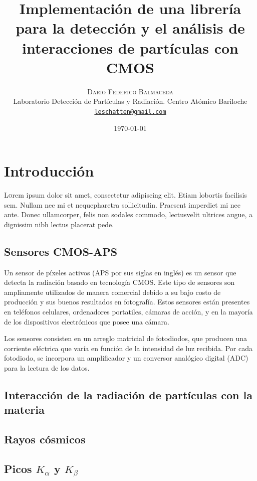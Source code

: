 \documentclass[twoside,twocolumn]{article}
\title{Implementación de una librería para la detección y el análisis de interacciones de partículas con CMOS}
\author{%
    \textsc{Darío Federico Balmaceda} \\[1ex]     %
    \normalsize Laboratorio Detección de Partículas y Radiación. Centro Atómico Bariloche \\                                    %
    \normalsize \href{mailto:leschatten@gmail.com}{\texttt{leschatten@gmail.com}}                   %
  }
\date{\today}                                                                %
\begin{document}
  
  \maketitle              %
  
  \section{Introducción}
    \lettrine[nindent=0em,lines=3]{L} orem ipsum dolor sit amet, consectetur adipiscing elit.
      Etiam lobortis facilisis sem. Nullam nec mi et nequepharetra sollicitudin.
      Praesent imperdiet mi nec ante. Donec ullamcorper, felis non sodales commodo,
      lectusvelit ultrices augue, a dignissim nibh lectus placerat pede.

    \subsection{Sensores CMOS-APS}
      Un sensor de píxeles activos (APS por sus siglas en inglés) es un sensor que detecta la radiación basado en tecnología CMOS.
      Este tipo de sensores son ampliamente utilizados de manera comercial debido a su
      bajo costo de producción y sus buenos resultados en fotografía.
      Estos sensores están presentes en teléfonos celulares, ordenadores portatiles, cámaras de acción,
      y en la mayoría de los dispositivos electrónicos que posee una cámara.

      Los sensores consisten en un arreglo matricial de fotodiodos, 
      que producen una corriente eléctrica que varía en función de la intensidad de luz recibida.
      Por cada fotodiodo, se incorpora un amplificador y un conversor analógico digital (ADC) para la lectura de los datos.
  

    \subsection{Interacción de la radiación de partículas con la materia}

    \subsection{Rayos cósmicos}
    
    \subsection{Picos $K_{\alpha}$ y $K_{\beta}$}
\end{document}
